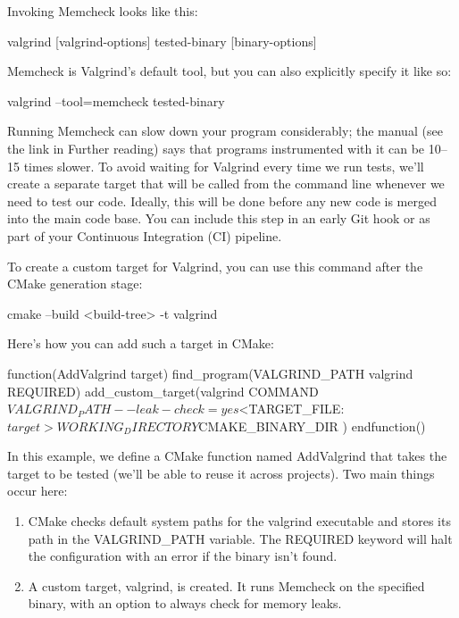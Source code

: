 Invoking Memcheck looks like this:

\begin{shell}
valgrind [valgrind-options] tested-binary [binary-options]
\end{shell}

Memcheck is Valgrind's default tool, but you can also explicitly specify it like so:

\begin{shell}
valgrind --tool=memcheck tested-binary
\end{shell}

Running Memcheck can slow down your program considerably; the manual (see the link in Further reading) says that programs instrumented with it can be 10–15 times slower. To avoid waiting for Valgrind every time we run tests, we’ll create a separate target that will be called from the command line whenever we need to test our code. Ideally, this will be done before any new code is merged into the main code base. You can include this step in an early Git hook or as part of your Continuous Integration (CI) pipeline.

To create a custom target for Valgrind, you can use this command after the CMake generation stage:

\begin{shell}
cmake --build <build-tree> -t valgrind
\end{shell}

Here’s how you can add such a target in CMake:


\begin{cmake}
function(AddValgrind target)
    find_program(VALGRIND_PATH valgrind REQUIRED)
    add_custom_target(valgrind
        COMMAND ${VALGRIND_PATH} --leak-check=yes
        $<TARGET_FILE:${target}>
        WORKING_DIRECTORY ${CMAKE_BINARY_DIR}
    )
endfunction()
\end{cmake}

In this example, we define a CMake function named AddValgrind that takes the target to be tested (we’ll be able to reuse it across projects). Two main things occur here:

\begin{enumerate}
\item
CMake checks default system paths for the valgrind executable and stores its path in the VALGRIND\_PATH variable. The REQUIRED keyword will halt the configuration with an error if the binary isn’t found.

\item
A custom target, valgrind, is created. It runs Memcheck on the specified binary, with an option to always check for memory leaks.
\end{enumerate}

